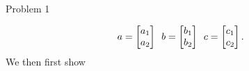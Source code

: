 \begin{problem}{Problem 1}
\begin{highlight}
        \begin{equation}
            a = 
            \begin{bmatrix}
                a_{1} \\
                a_{2} \\
            \end{bmatrix}
            \hspace*{5pt}
            b = 
            \begin{bmatrix}
                b_{1} \\
                b_{2} \\
            \end{bmatrix}
            \hspace*{5pt}
            c = 
            \begin{bmatrix}
                c_{1} \\
                c_{2} \\
            \end{bmatrix}.
        \end{equation}
        We then first show


\end{highlight}
\end{problem}
